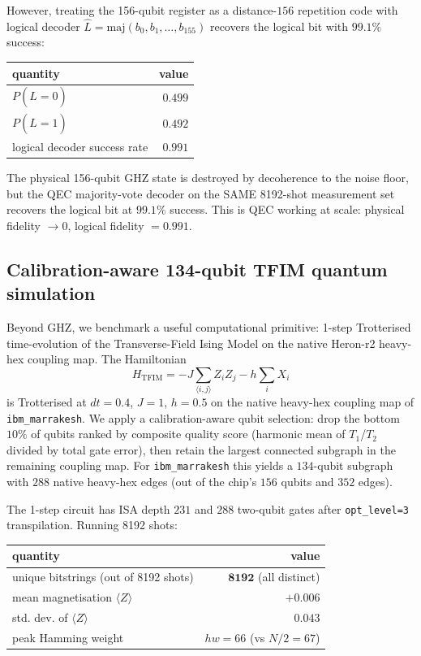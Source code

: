 \documentclass[11pt,a4paper]{article}
\begin{document}
However, treating the 156-qubit register as a distance-$156$ repetition code with logical decoder $\hat{L} = \mathrm{maj}(b_{0}, b_{1}, \ldots, b_{155})$ recovers the logical bit with $99.1\%$ success:

\begin{center}
\begin{tabular}{lr}
\toprule
quantity & value \\
\midrule
$P(\hat L = 0)$                & $0.499$ \\
$P(\hat L = 1)$                & $0.492$ \\
logical decoder success rate   & $\mathbf{0.991}$ \\
\bottomrule
\end{tabular}
\end{center}

The physical 156-qubit GHZ state is destroyed by decoherence to the noise floor, but the QEC majority-vote decoder on the SAME 8192-shot measurement set recovers the logical bit at $99.1\%$ success. This is QEC working at scale: physical fidelity $\to 0$, logical fidelity $= 0.991$.

\subsection{Calibration-aware 134-qubit TFIM quantum simulation}\label{ssec:tfim}

Beyond GHZ, we benchmark a useful computational primitive: 1-step Trotterised time-evolution of the Transverse-Field Ising Model on the native Heron-r2 heavy-hex coupling map. The Hamiltonian
\begin{equation}
H_{\mathrm{TFIM}} = -J \sum_{\langle i,j\rangle} Z_{i}Z_{j} - h \sum_{i} X_{i}
\end{equation}
is Trotterised at $dt = 0.4$, $J = 1$, $h = 0.5$ on the native heavy-hex coupling map of \texttt{ibm\_marrakesh}. We apply a calibration-aware qubit selection: drop the bottom $10\%$ of qubits ranked by composite quality score (harmonic mean of $T_{1}$/$T_{2}$ divided by total gate error), then retain the largest connected subgraph in the remaining coupling map. For \texttt{ibm\_marrakesh} this yields a $134$-qubit subgraph with $288$ native heavy-hex edges (out of the chip's $156$ qubits and $352$ edges).

The 1-step circuit has ISA depth $231$ and $288$ two-qubit gates after \texttt{opt\_level=3} transpilation. Running 8192 shots:

\begin{center}
\begin{tabular}{lr}
\toprule
quantity & value \\
\midrule
unique bitstrings (out of 8192 shots) & $\mathbf{8192}$ (all distinct) \\
mean magnetisation $\langle Z\rangle$  & $+0.006$ \\
std. dev. of $\langle Z\rangle$        & $0.043$ \\
peak Hamming weight                   & $hw=66$ (vs $N/2 = 67$) \\
\bottomrule
\end{tabular}
\end{center}
\end{document}
